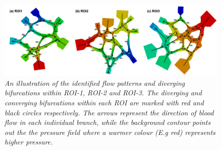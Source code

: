 \begin{figure}[H]
\centering
\includegraphics[width=1\textwidth]{images/ROI-Diagrams.png}
\caption{\textit{An illustration of the identified flow patterns and diverging bifurcations within ROI-1, ROI-2 and ROI-3. The diverging and converging bifurcations within each ROI are marked with red and black circles respectively. The arrows represent the direction of blood flow in each individual branch, while the background contour points out the the pressure field where a warmer colour (E.g red) represents higher pressure.} \label{ROIs}}
\end{figure}



